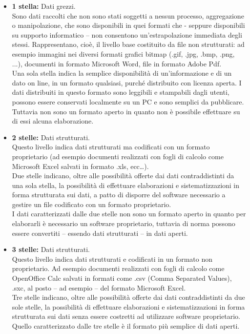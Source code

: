 \documentclass{article}
\theoremstyle{plain}
\theoremstyle{definition}
\begin{document}
\begin{itemize}
\item \textbf{1 stella:} Dati grezzi. 
\\
Sono dati raccolti che non sono stati soggetti a nessun processo, aggregazione o manipolazione, che sono disponibili in quei formati che - seppure disponibili su supporto informatico – non consentono un'estrapolazione immediata degli stessi. Rappresentano, cioè, il livello base costituito da file non strutturati: ad esempio immagini nei diversi formati grafici bitmap (.gif, .jpg, .bmp, .png, ...), documenti in formato Microsoft Word, file in formato Adobe Pdf. 
\\
Una sola stella indica la semplice disponibilità di un'informazione e di un dato on line, in un formato qualsiasi, purché distribuito con licenza aperta. I dati distribuiti in questo formato sono leggibili e stampabili dagli utenti, possono essere conservati localmente su un PC e sono semplici da pubblicare. Tuttavia non sono un formato aperto in quanto non è possibile effettuare su di essi alcuna elaborazione.
\item \textbf{2 stelle:} Dati strutturati. 
\\
Questo livello indica dati strutturati ma codificati con un formato proprietario (ad esempio documenti realizzati con fogli di calcolo come Microsoft Excel salvati in formato .xls, ecc…). 
\\
Due stelle indicano, oltre alle possibilità offerte dai dati contraddistinti da una sola stella, la possibilità di effettuare elaborazioni e sistematizzazioni in forma strutturata sui dati, a patto di disporre del software necessario a gestire un file codificato con un formato proprietario. 
\\
I dati caratterizzati dalle due stelle non sono un formato aperto in quanto per elaborarli è necessario un software proprietario, tuttavia di norma possono essere convertiti – essendo dati strutturati – in dati aperti.

\item \textbf{3 stelle:} Dati strutturati. 
\\
Questo livello indica dati strutturati e codificati in un formato non proprietario. Ad esempio documenti realizzati con fogli di calcolo come OpenOffice Calc salvati in formati come .csv (Comma Separated Values), .sxc, al posto – ad esempio – del formato Microsoft Excel. 
\\
Tre stelle indicano, oltre alle possibilità offerte dai dati contraddistinti da due sole stelle, la possibilità di effettuare elaborazioni e sistematizzazioni in forma strutturata sui dati senza essere costretti ad utilizzare software proprietario. Quello caratterizzato dalle tre stelle è il formato più semplice di dati aperti.


\end{itemize}
\end{document}
